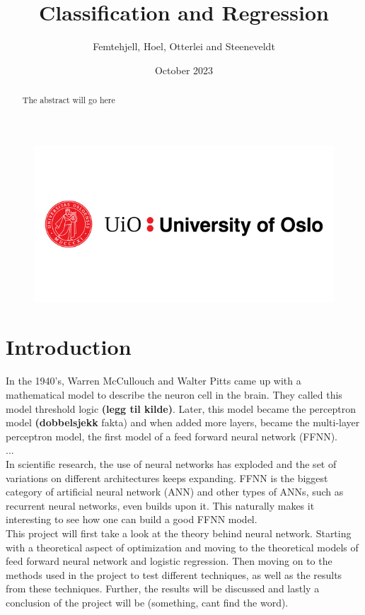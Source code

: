 \documentclass{article}
\title{Classification and Regression}
\author{Femtehjell, Hoel, Otterlei and Steeneveldt}
\date{October 2023}
\theoremstyle{definition}
\begin{document}

\maketitle
\begin{figure}[H]
    \centering
    \includegraphics[scale=0.5]{1797261_uio-logo.png}
\end{figure}
\newpage
\tableofcontents
\listoffigures


\newpage

\begin{abstract}
    The abstract will go here
\end{abstract}

\section{Introduction}
In the 1940's, Warren McCullouch and Walter Pitts came up with a mathematical model to describe the neuron cell in the brain. They called this model threshold logic \textbf{(legg til kilde)}. Later, this model became the perceptron model \textbf{(dobbelsjekk} fakta) and when added more layers, became the multi-layer perceptron model, the first model of a feed forward neural network (FFNN). \\
... \\
In scientific research, the use of neural networks has exploded and the set of variations on different architectures keeps expanding. FFNN is the biggest category of artificial neural network (ANN) and other types of ANNs, such as recurrent neural networks, even builds upon it. This naturally makes it interesting to see how one can build a good FFNN model. \\
This project will first take a look at the theory behind neural network. Starting with a theoretical aspect of optimization and moving to the theoretical models of feed forward neural network and logistic regression. Then moving on to the methods used in the project to test different techniques, as well as the results from these techniques. Further, the results will be discussed and lastly a conclusion of the project will be (something, cant find the word).
\end{document}
